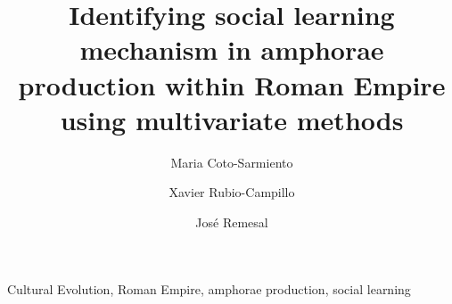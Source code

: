 \documentclass[review]{elsarticle}
\begin{document}
\begin{frontmatter}

\title{Identifying social learning mechanism in amphorae production within Roman Empire using multivariate methods }


\author[bscadress]{Maria Coto-Sarmiento }
\author[edadress]{Xavier Rubio-Campillo}
\author[ceipacadress]{Jos\'e Remesal}




\address[bscadress]{Barcelona Supercomputing Center (BSC), Barcelona, Spain}
\address[edadress]{University of Edinburgh, UK}
\address[ceipacadress]{CEIPAC, University of Barcelona, Barcelona, Spain}
\begin{abstract}
\end{abstract}

\begin{keyword}Cultural Evolution, Roman Empire, amphorae production, social learning
\end{keyword}

 \end{frontmatter}

\linenumbers


\end{document}
